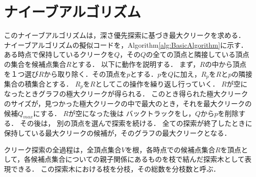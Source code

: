 \section{ナイーブアルゴリズム}
\label{sec:naive}
このナイーブアルゴリズムは，深さ優先探索に基づき最大クリークを求める．
ナイーブアルゴリズムの擬似コードを，Algorithm\ref{alg:BasicAlgorithm}に示す．
ある時点で保持しているクリークを$Q$，その$Q$の全ての頂点と隣接している頂点の集合を候補点集合$R$とする．
以下に動作を説明する．
まず，$R$の中から頂点を１つ選び$R$から取り除く．その頂点を$p$とする．$p$を$Q$に加え，$R_p$を$R$と$p$の隣接集合の積集合とする．
$R_p$を$R$としてこの操作を繰り返し行っていく．
$R$が空になったときグラフの極大クリークが得られる．
このとき得られた極大クリークのサイズが，見つかった極大クリークの中で最大のとき，それを最大クリークの候補$Q_{max}$にする．
$R$が空になった後は%
バックトラックをし，$Q$から$p$を削除する．
その後は，
別の頂点を選んで探索を続ける．
全ての探索が終了したときに保持している最大クリークの候補が，そのグラフの最大クリークとなる．

クリーク探索の全過程は，全頂点集合$V$を根，各時点での候補点集合$R$を頂点として，各候補点集合についての親子関係にあるものを枝で結んだ探索木として表現できる．
この探索木における枝を分枝，その総数を分枝数と呼ぶ．

